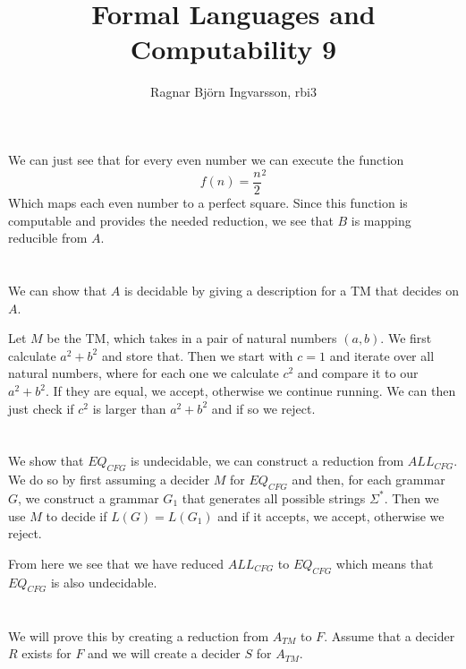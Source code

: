 \documentclass{article}
\title{Formal Languages and Computability 9}
\author{Ragnar Björn Ingvarsson, rbi3}
\begin{document}
\renewcommand\thepage{}

	\maketitle

	\newpage
	\setcounter{page}{1}
	\renewcommand\thepage{\arabic{page}}

	\section{}
	We can just see that for every even number we can execute the function 
	\begin{equation}
		f(n) = \frac{n}{2}^2
		\label{eq:gamer}
	\end{equation}
	Which maps each even number to a perfect square. Since this function 
	is computable and provides the needed reduction, we see that $B$ is 
	mapping reducible from $A$.

	\section{}
	We can show that $A$ is decidable by giving a description for a TM that 
	decides on $A$.

	Let $M$ be the TM, which takes in a pair of natural numbers $(a,b)$. 
	We first calculate $a^2 + b^2$ and store that. Then we start with $c=1$ 
	and iterate over all natural numbers, where for each one we calculate 
	$c^2$ and compare it to our $a^2 + b^2$. If they are equal, we accept, 
	otherwise we continue running. We can then just check if $c^2$ is larger 
	than $a^2 + b^2$ and if so we reject.
	\section{}
	We show that $EQ_{CFG}$ is undecidable, we can construct a reduction 
	from $ALL_{CFG}$. We do so by first assuming a decider $M$ for 
	$EQ_{CFG}$ and then, for each grammar $G$, we construct a grammar $G_1$ that generates all 
	possible strings $\Sigma^*$. Then we use $M$ to decide if 
	$L(G) = L(G_1)$ and if it accepts, we accept, otherwise we reject. 

	From here we see that we have reduced $ALL_{CFG}$ to $EQ_{CFG}$ which 
	means that $EQ_{CFG}$ is also undecidable.

	\section{}
	We will prove this by creating a reduction from $A_{TM}$ to $F$.
	Assume that a decider $R$ exists for $F$ and we will create a decider 
	$S$ for $A_{TM}$.
\end{document}
